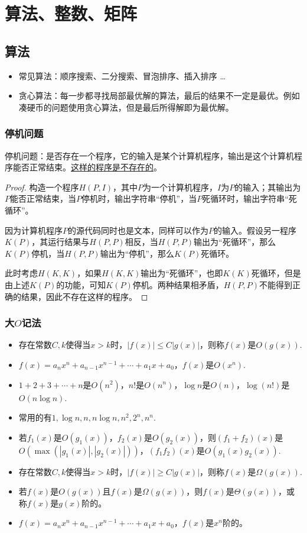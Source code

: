 \section{算法、整数、矩阵}

\subsection{算法}
\begin{itemize}
    \item 常见算法：顺序搜索、二分搜索、冒泡排序、插入排序 \ldots
    \item 贪心算法：每一步都寻找局部最优解的算法，最后的结果不一定是最优。例如凑硬币的问题使用贪心算法，但是最后所得解即为最优解。
\end{itemize}

\subsubsection*{停机问题}
停机问题：是否存在一个程序，它的输入是某个计算机程序，输出是这个计算机程序能否正常结束。\uline{这样的程序是不存在的}。
\begin{proof}
构造一个程序$H(P,I)$，其中$P$为一个计算机程序，$I$为$P$的输入；其输出为$P$能否正常结束，当$P$停机时，输出字符串“停机”，当$P$死循环时，输出字符串“死循环”。

因为计算机程序$P$的源代码同时也是文本，同样可以作为$P$的输入。假设另一程序$K(P)$，其运行结果与$H(P,P)$相反，当$H(P,P)$输出为“死循环”，那么$K(P)$停机，当$H(P,P)$输出为“停机”，那么$K(P)$死循环。

此时考虑$H(K,K)$，如果$H(K,K)$输出为“死循环”，也即$K(K)$死循环，但是由上述$K(P)$的功能，可知$K(P)$停机。两种结果相矛盾，$H(P,P)$不能得到正确的结果，因此不存在这样的程序。
\end{proof}

\subsubsection*{大$O$记法}
\begin{itemize}
    \item 存在常数$C, k$使得当$x > k$时，$|f(x)| \le C|g(x)|$，则称$f(x)$是$O(g(x))$.
    \item $f(x) = a_n x^n + a_{n-1} x^{n-1} + \cdots + a_1 x + a_0$，$f(x)$是$O(x^n)$.
    \item $1 + 2 + 3 + \cdots + n$是$O(n^2)$，$n!$是$O(n^n)$，$\log n$是$O(n)$，$\log(n!)$是$O(n \log n)$.
    \item 常用的有$1, \log n, n, n\log n, n^2, 2^n, n^n$.
    \item 若$f_1(x)$是$O(g_1(x))$，$f_2(x)$是$O(g_2(x))$，则$(f_1 + f_2)(x)$是$O(\max(|g_1(x)|,|g_2(x)|))$，$(f_1 f_2)(x)$是$O(g_1(x) g_2(x))$.
    \item 存在常数$C, k$使得当$x > k$时，$|f(x)| \ge C|g(x)|$，则称$f(x)$是$\Omega (g(x))$.
    \item 若$f(x)$是$O(g(x))$且$f(x)$是$\Omega (g(x))$，则$f(x)$是$\Theta (g(x))$，或称$f(x)$是$g(x)$阶的。
    \item $f(x) = a_n x^n + a_{n-1} x^{n-1} + \cdots + a_1 x + a_0$，$f(x)$是$x^n$阶的。
\end{itemize}

